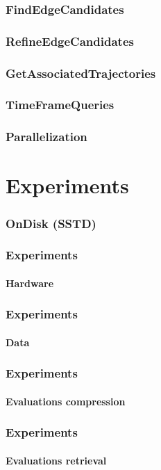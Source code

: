 \documentclass{beamer}
\begin{document}
\begin{frame}
	\frametitle{FindEdgeCandidates}
\end{frame}

\begin{frame}
	\frametitle{RefineEdgeCandidates}
\end{frame}

\begin{frame}
	\frametitle{GetAssociatedTrajectories}
\end{frame}

\begin{frame}
	\frametitle{TimeFrameQueries}
\end{frame}

\begin{frame}
	\frametitle{Parallelization}
\end{frame}

\section{Experiments}

\begin{frame}
	\frametitle{OnDisk (SSTD)}
\end{frame}

\begin{frame}
	\frametitle{Experiments}
	\framesubtitle{Hardware}
\end{frame}

\begin{frame}
	\frametitle{Experiments}
	\framesubtitle{Data}
\end{frame}

\begin{frame}
	\frametitle{Experiments}
	\framesubtitle{Evaluations compression}
\end{frame}

\begin{frame}
	\frametitle{Experiments}
	\framesubtitle{Evaluations retrieval}
\end{frame}
\end{document}
